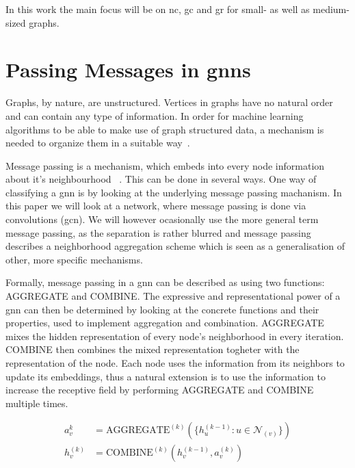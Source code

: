 In this work the main focus will be on \ac{nc}, \ac{gc} and \ac{gr} for small- as well as medium-sized graphs.

\section{Passing Messages in \Acsp*{gnn}}
\label{sec:related:message}

Graphs, by nature, are unstructured. Vertices in graphs have no natural order and can
contain any type of information. In order for machine learning algorithms to be able
to make use of graph structured data, a mechanism is needed to organize them in a
suitable way~\cite{Zhou2020a,Hamilton2017a,Zhang19}.


Message passing is a mechanism, which embeds into every node information about it's neighbourhood ~\cite{Xu2019,Zhou2020a}. This can be done in several ways. One way of classifying a \ac{gnn} is by looking at the underlying message passing machanism. In this paper we will look at a network, where message passing is done via convolutions (\acf{gcn}). We will however ocasionally use the more general term message passing, as the separation is rather blurred and message passing describes a neighborhood aggregation scheme which is seen as a generalisation of other, more specific mechanisms.

Formally, message passing in a \ac{gnn} can be described as using two functions:
AGGREGATE and COMBINE. The expressive and representational power of a \ac{gnn} can
then be determined by looking at the concrete functions and their properties, used to implement
aggregation and combination. AGGREGATE mixes the hidden representation of every node's neighborhood in every iteration. COMBINE then combines the mixed representation togheter with the representation of the node. Each node uses the information from its neighbors to update its embeddings, thus a natural extension is to use the information to increase the receptive field by performing AGGREGATE and COMBINE multiple times.

\begin{align*}
    a_{v}^{k}   & = \mathrm{AGGREGATE}^{(k)}(\{h_{u}^{(k-1)}: u \in \mathcal{N}_{(v)}\}) \\
    h_{v}^{(k)} & = \mathrm{COMBINE}^{(k)}(h_{v}^{(k-1)}, a_{v}^{(k)})
\end{align*}

